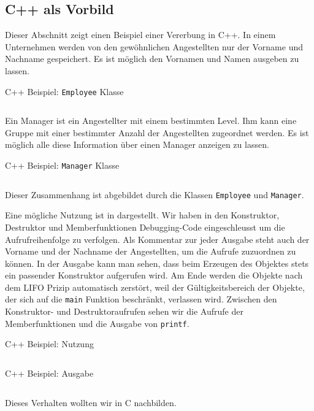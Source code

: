 \subsection{C++ als Vorbild}
Dieser Abschnitt zeigt einen Beispiel einer Vererbung in C++.
In einem Unternehmen werden von den gewöhnlichen Angestellten nur der Vorname und Nachname gespeichert.
Es ist möglich den Vornamen und Namen ausgeben zu lassen.

\begin{code}
	\caption{C++ Beispiel: \texttt{Employee} Klasse}
	\label{code:virtcpp:employee}
	\inputminted{cpp}{code/examples/employees_virt_cpp/employee.hpp}
\end{code}

Ein Manager ist ein Angestellter mit einem bestimmten Level.
Ihm kann eine Gruppe mit einer bestimmter Anzahl der Angestellten zugeordnet werden.
Es ist möglich alle diese Information über einen Manager anzeigen zu lassen.

\begin{code}
	\caption{C++ Beispiel: \texttt{Manager} Klasse}
	\label{code:virtcpp:manager}
	\inputminted{cpp}{code/examples/employees_virt_cpp/manager.hpp}
\end{code}

Dieser Zusammenhang ist abgebildet durch die Klassen \texttt{Employee} und \texttt{Manager}.

Eine mögliche Nutzung ist in  dargestellt.
Wir haben in den Konstruktor, Destruktor und Memberfunktionen Debugging-Code eingeschleusst um die Aufrufreihenfolge zu verfolgen.
Als Kommentar zur jeder Ausgabe steht auch der Vorname und der Nachname der Angestellten, um die Aufrufe zuzuordnen zu können.
In der Ausgabe kann man sehen, dass beim Erzeugen des Objektes stets ein passender Konstruktor aufgerufen wird.
Am Ende werden die Objekte nach dem LIFO Prizip automatisch zerstört, weil der Gültigkeitsbereich der Objekte, der sich auf die \texttt{main} Funktion beschränkt, verlassen wird.
Zwischen den Konstruktor- und Destruktoraufrufen sehen wir die Aufrufe der Memberfunktionen und die Ausgabe von \texttt{printf}.

\begin{code}
	\caption{C++ Beispiel: Nutzung}
	\label{code:virtcpp:usage}
	\inputminted{cpp}{code/examples/employees_virt_cpp/main.cpp}
\end{code}

\begin{code}
	\caption{C++ Beispiel: Ausgabe}
	\label{code:virtcpp:output}
	\inputminted[bgcolor=white]{text}{code/examples/employees_virt_cpp/output.txt}
\end{code}

Dieses Verhalten wollten wir in C nachbilden.
